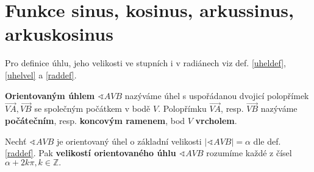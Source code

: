\section{Funkce sinus, kosinus, arkussinus, arkuskosinus}

\begin{pozn}
  Pro definice úhlu, jeho velikosti ve stupních i v radiánech viz def. \ref{uheldef}, \ref{uhelvel} a \ref{raddef}.
\end{pozn}

\begin{comment}
\begin{definition}
    Nechť $\sphericalangle AVB$ je úhel. Pak mu přiřazujeme číslo $a\in \mathbb R$,
    které nazýváme \textbf{velikostí úhlu} $\sphericalangle AVB$ takto:\\
    Nechť $k(V,r), X\in k\cap \overrightarrow{VA}, Y\in k\cap \overrightarrow{VB}.$
    Označme $s$ velikost oblouku $XY.$ Velikost úhlu pak definujeme jako
    $$\alpha = \frac{s}{r}.$$
\end{definition}

\begin{pozn}
    Je-li $s=r,$ má úhel $\alpha$ velikost 1 \textbf{radián}. Velikost úhlu lze vyjadřovat
    též ve stupních, přičemž platí $2\pi=360^\circ$.
\end{pozn}

\begin{veta}
    Nechť $\sphericalangle AVB$ je úhel, $\alpha$ jeho velikost v radiánech a $\beta$
    jeho velikost ve stupních. Pak platí:
    \begin{align*}
        \alpha = \beta\cdot \frac{\pi}{180^\circ}, & & \beta = \alpha\cdot \frac{180^\circ}{\pi}.
    \end{align*}
\end{veta}

PRESUNUTO DO PLANIMETRIE
\end{comment}

\begin{definition}
    \textbf{Orientovaným úhlem} $\sphericalangle AVB$ nazýváme úhel s uspořádanou dvojicí
    polopřímek $\overrightarrow{VA}, \overrightarrow{VB}$ se společným počátkem v bodě $V.$
    Polopřímku $\overrightarrow{VA}$, resp. $\overrightarrow{VB}$ nazýváme \textbf{počátečním},
    resp. \textbf{koncovým ramenem}, bod $V$ \textbf{vrcholem}.
\end{definition}

\begin{definition}
    Nechť $\sphericalangle AVB$ je orientovaný úhel o základní velikosti $|\sphericalangle AVB| = \alpha$ dle def. \ref{raddef}. Pak
    \textbf{velikostí orientovaného úhlu} $\sphericalangle AVB$ rozumíme každé z
    čísel $\alpha +2k\pi, k \in \mathbb Z.$
\end{definition}

